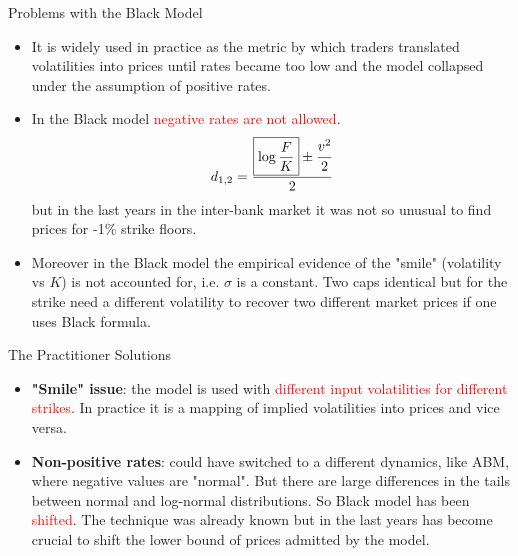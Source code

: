 \documentclass{beamer}
\begin{document}
\begin{frame}{Problems with the Black Model}
	\begin{itemize}
		\item It is widely used in practice as the metric by which traders translated volatilities into prices until rates became too low and the model collapsed under the assumption of positive rates.
		\item In the Black model \textcolor{red}{negative rates are not allowed}.
		\begin{equation*}
			d_{1,2} = \frac{\boxed{\log{\frac{F}{K}}} \pm \cfrac{v^2}{2}}{2} 
		\end{equation*}
		but in the last years in the inter-bank market it was not so unusual to find prices for -1\% strike floors.
		\item Moreover in the Black model the empirical evidence of the "smile" (volatility vs $K$) is not accounted for, i.e. $\sigma$ is a constant. Two caps identical but for the strike need a different volatility to recover two different market prices if one uses Black formula.
	\end{itemize}
\end{frame}

\begin{frame}{The Practitioner Solutions}
	\begin{itemize}
		\item \textbf{"Smile" issue}: the model is used with \textcolor{red}{different input volatilities for different strikes}. In practice it is a mapping of implied volatilities into prices and vice versa.
		\item \textbf{Non-positive rates}: could have switched to a different dynamics, like ABM, where negative values are "normal". But there are large differences in the tails between normal and log-normal distributions.
		So Black model has been \textcolor{red}{shifted}. The technique was already known but in the last years has become crucial to shift the lower bound of prices admitted by the model.
	\end{itemize}
\end{frame}
\end{document}
